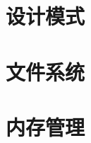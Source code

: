 \documentclass[
    UTF8,       %
    b5paper,    %
    10pt,       %
    oneside,    %
    openright,  %
    titlepage,  %
    final       %
]{ctexbook}
\begin{document}

    \maketitle
    \chapter{设计模式}
    


    \maketitle
    \chapter{文件系统}
    
    

    \maketitle
    \chapter{内存管理}

    \maketitle
\end{document}
